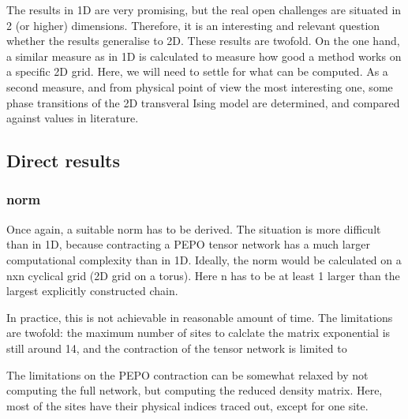 The results in 1D are very promising, but the real open challenges are situated in 2 (or higher) dimensions. Therefore, it is an interesting and relevant question whether the results generalise to 2D. These results are twofold. On the one hand, a similar measure as in 1D is calculated to measure how good a method works on a specific 2D grid. Here, we will need to settle for what can be computed. As a second measure, and from physical point of view the most interesting one, some phase transitions of the 2D transveral Ising model are determined, and compared against values in literature.

\subsection{Direct results}

\subsubsection{norm}

Once again, a suitable norm has to be derived. The situation is more difficult than in 1D, because contracting a PEPO tensor network has a much larger computational complexity than in 1D. Ideally, the norm would be calculated on a nxn cyclical grid (2D grid on a torus). Here n has to be at least 1 larger than the largest explicitly constructed chain.

In practice, this is not achievable in reasonable amount of time. The limitations are twofold: the maximum number of sites to calclate the matrix exponential is still around 14, and the contraction of the tensor network is limited to 

The limitations on the PEPO contraction can be somewhat relaxed by not computing the full network, but computing the reduced density matrix. Here, most of the sites have their physical indices traced out, except for one site.

